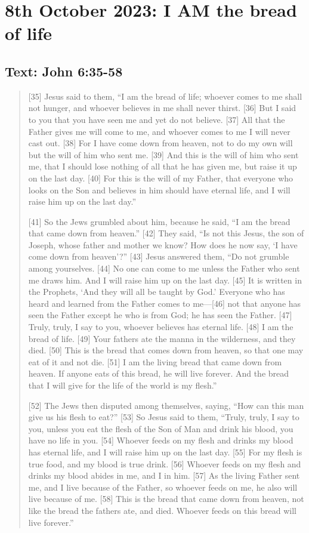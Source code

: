 \setcounter{figure}{0}

\section{8th October 2023: I AM the bread of life}
\subsection*{Text: John 6:35-58}
  \begin{quote}
    [35] Jesus said to them, “I am the bread of life; whoever comes to me shall not hunger, and whoever believes in me shall never thirst. [36] But I said to you that you have seen me and yet do not believe. [37] All that the Father gives me will come to me, and whoever comes to me I will never cast out. [38] For I have come down from heaven, not to do my own will but the will of him who sent me. [39] And this is the will of him who sent me, that I should lose nothing of all that he has given me, but raise it up on the last day. [40] For this is the will of my Father, that everyone who looks on the Son and believes in him should have eternal life, and I will raise him up on the last day.”

    [41] So the Jews grumbled about him, because he said, “I am the bread that came down from heaven.” [42] They said, “Is not this Jesus, the son of Joseph, whose father and mother we know? How does he now say, ‘I have come down from heaven’?” [43] Jesus answered them, “Do not grumble among yourselves. [44] No one can come to me unless the Father who sent me draws him. And I will raise him up on the last day. [45] It is written in the Prophets, ‘And they will all be taught by God.’ Everyone who has heard and learned from the Father comes to me—[46] not that anyone has seen the Father except he who is from God; he has seen the Father. [47] Truly, truly, I say to you, whoever believes has eternal life. [48] I am the bread of life. [49] Your fathers ate the manna in the wilderness, and they died. [50] This is the bread that comes down from heaven, so that one may eat of it and not die. [51] I am the living bread that came down from heaven. If anyone eats of this bread, he will live forever. And the bread that I will give for the life of the world is my flesh.”

    [52] The Jews then disputed among themselves, saying, “How can this man give us his flesh to eat?” [53] So Jesus said to them, “Truly, truly, I say to you, unless you eat the flesh of the Son of Man and drink his blood, you have no life in you. [54] Whoever feeds on my flesh and drinks my blood has eternal life, and I will raise him up on the last day. [55] For my flesh is true food, and my blood is true drink. [56] Whoever feeds on my flesh and drinks my blood abides in me, and I in him. [57] As the living Father sent me, and I live because of the Father, so whoever feeds on me, he also will live because of me. [58] This is the bread that came down from heaven, not like the bread the fathers ate, and died. Whoever feeds on this bread will live forever.”
  \end{quote}
